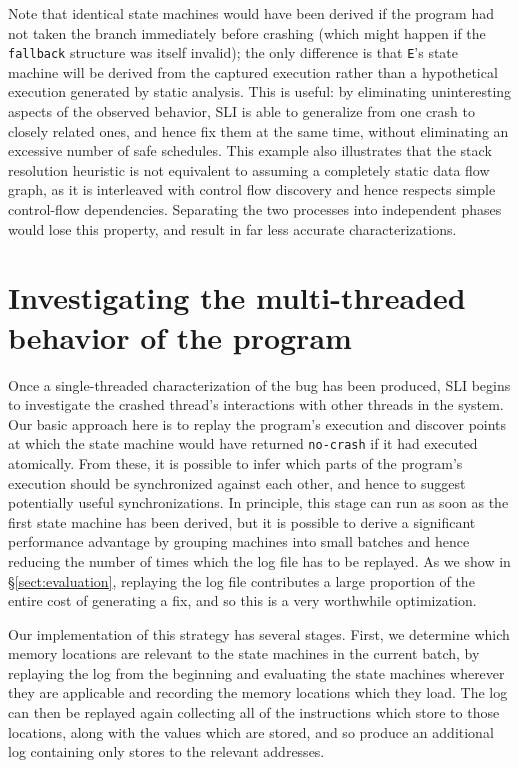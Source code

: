 \documentclass[10pt,twocolumn,preprint,natbib,authoryear]{sigplanconf}
\newcommand{\editorial}[1]{}
\begin{document}
Note that identical state machines would have been derived if the
program had not taken the branch immediately before crashing (which
might happen if the \verb|fallback| structure was itself invalid); the
only difference is that \verb|E|'s state machine will be derived from
the captured execution rather than a hypothetical execution generated
by static analysis.  This is useful: by eliminating uninteresting
aspects of the observed behavior, SLI is able to generalize from one
crash to closely related ones, and hence fix them at the same time,
without eliminating an excessive number of safe schedules.  This
example also illustrates that the stack resolution heuristic is not
equivalent to assuming a completely static data flow graph, as it is
interleaved with control flow discovery and hence respects simple
control-flow dependencies.  Separating the two processes into
independent phases would lose this property, and result in far less
accurate characterizations.\editorial{ref phase order problem?}

\section{Investigating the multi-threaded behavior of the program}
\label{sect:multi_threading}

Once a single-threaded characterization of the bug has been produced,
SLI begins to investigate the crashed thread's interactions with other
threads in the system.  Our basic approach here is to replay the
program's execution and discover points at which the state machine
would have returned \verb|no-crash| if it had executed atomically.
From these, it is possible to infer which parts of the program's
execution should be synchronized against each other, and hence to
suggest potentially useful synchronizations.  In principle, this stage
can run as soon as the first state machine has been derived, but it is
possible to derive a significant performance advantage by grouping
machines into small batches and hence reducing the number of times
which the log file has to be replayed.  As we show in
\S\ref{sect:evaluation}, replaying the log file contributes a large
proportion of the entire cost of generating a fix, and so this is a
very worthwhile optimization.

Our implementation of this strategy has several stages.  First, we
determine which memory locations are relevant to the state machines in
the current batch, by replaying the log from the beginning and
evaluating the state machines wherever they are applicable and
recording the memory locations which they load.  The log can then be
replayed again collecting all of the instructions which store to those
locations, along with the values which are stored, and so produce an
additional log containing only stores to the relevant addresses.
\end{document}
